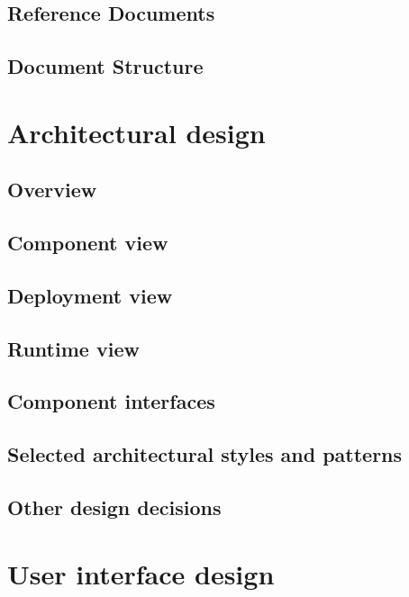     \section{Reference Documents}
        
    \section{Document Structure}
    	
    
\newpage
\chapter{Architectural design}
    \section{Overview}
    	
    \section{Component view} \label{sec:components}
    	
    \section{Deployment view}
    	
    \section{Runtime view}
    	
    \section{Component interfaces}
    		\label{sec:interfaces}
    \section{Selected architectural styles and patterns}
    	
    \section{Other design decisions}
    	
\newpage
\chapter{User interface design}
